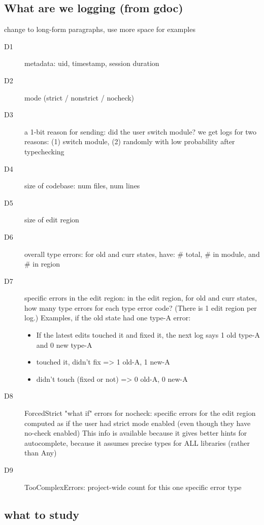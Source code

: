 \documentclass[
  acmsmall,
  review,
]{acmart}
\begin{document}
\subsection{What are we logging (from gdoc)}

\FILL{} change to long-form paragraphs, use more space for examples

\begin{description}
  \item[D1] metadata: uid, timestamp, session duration
  \item[D2] mode (strict / nonstrict / nocheck)
  \item[D3] a 1-bit reason for sending: did the user switch module?
    \subitem we get logs for two reasons: (1) switch module, (2) randomly with
    low probability after typechecking
  \item[D4] size of codebase: num files, num lines
  \item[D5] size of edit region
  \item[D6] overall type errors: for old and curr states, have: \# total, \# in module, and \# in region
  \item[D7] specific errors in the edit region: in the edit region, for old and
    curr states, how many type errors for each type error code? (There is 1
    edit region per log.)
    \subitem Examples, if the old state had one type-A error:
    \begin{itemize}
      \item If the latest edits touched it and fixed it, the next log says 1
        old type-A and 0 new type-A
      \item touched it, didn't fix => 1 old-A, 1 new-A
      \item didn't touch (fixed or not) => 0 old-A, 0 new-A
    \end{itemize}
  \item[D8] ForcedStrict "what if" errors for nocheck: specific errors for the
    edit region computed as if the user had strict mode enabled (even though they
    have no-check enabled)
    \subitem This info is available because it gives better hints for
    autocomplete, because it assumes precise types for ALL libraries (rather
    than Any)
  \item[D9] TooComplexErrors: project-wide count for this one specific error type
\end{description}


\subsection{what to study}
\end{document}
